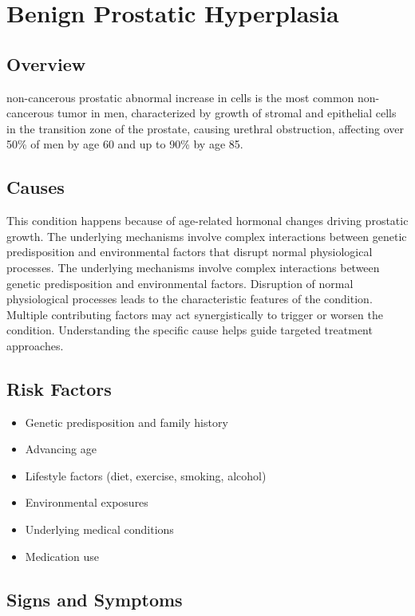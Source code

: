 \chapter{Benign Prostatic Hyperplasia}
\label{sec:Benign Prostatic Hyperplasia}

\section{Overview}
non-cancerous prostatic abnormal increase in cells is the most common non-cancerous tumor in men, characterized by growth of stromal and epithelial cells in the transition zone of the prostate, causing urethral obstruction, affecting over 50\% of men by age 60 and up to 90\% by age 85.
\section{Causes}
This condition happens because of age-related hormonal changes driving prostatic growth. The underlying mechanisms involve complex interactions between genetic predisposition and environmental factors that disrupt normal physiological processes. The underlying mechanisms involve complex interactions between genetic predisposition and environmental factors. Disruption of normal physiological processes leads to the characteristic features of the condition. Multiple contributing factors may act synergistically to trigger or worsen the condition. Understanding the specific cause helps guide targeted treatment approaches.
\section{Risk Factors}


\begin{itemize}[noitemsep]
  \item Genetic predisposition and family history
  \item Advancing age
  \item Lifestyle factors (diet, exercise, smoking, alcohol)
  \item Environmental exposures
  \item Underlying medical conditions
  \item Medication use
\end{itemize}
\section{Signs and Symptoms}

